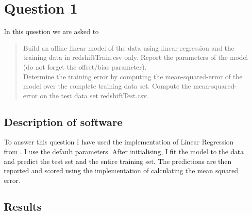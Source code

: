 \section{Question 1}
In this question we are asked to
\begin{quote}
  Build an affine linear model of the data using linear regression and the training data in redshiftTrain.csv only. Report the parameters of the model (do not forget the offset/bias parameter).\\
  Determine the training error by computing the mean-squared-error of the model over the complete training data set. Compute the mean-squared-error on the test data set redshiftTest.csv.
\end{quote}

\subsection{Description of software}
To answer this question I have used the implementation of Linear Regression from \cite{scikit-learn}. I use the default parameters. After initialising, I fit the model to the data and predict the test set and the entire training set. The predictions are then reported and scored using the \cite{scikit-learn} implementation of calculating the mean squared error.\\

\subsection{Results}

